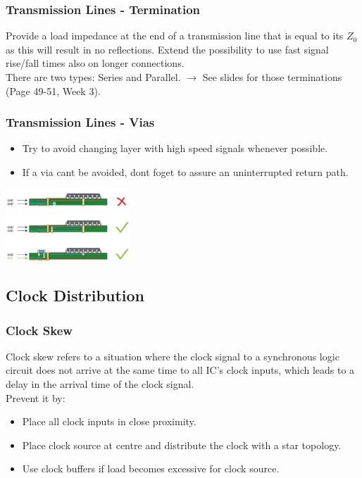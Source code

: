		\subsubsection{Transmission Lines - Termination}
			Provide a load impedance at the end of a transmission line that is equal to its $Z_0$ as this will result in no reflections. Extend the possibility to use fast signal rise/fall times also on longer connections.\\
			There are two types: Series and Parallel. $\rightarrow$ See slides for those terminations (Page 49-51, Week 3).
			
		\subsubsection{Transmission Lines - Vias}
			\begin{itemize}
				\setlength{\itemsep}{-4pt}
				\item Try to avoid changing layer with high speed signals whenever possible.
				\item If a via cant be avoided, dont foget to assure an uninterrupted return path. 
			\end{itemize}
			\begin{center}\includegraphics[width=0.35\textwidth]{images/TransmissionLineVias.png}\end{center} 
			
	\subsection{Clock Distribution}
		\subsubsection{Clock Skew}
		Clock skew refers to a situation where the clock signal to a synchronous logic circuit does not arrive at the same time to all IC's clock inputs, which leads to a delay in the arrival time of the clock signal. \\
		Prevent it by: 
		\begin{itemize}
				\setlength{\itemsep}{-4pt}
				\item Place all clock inputs in close proximity. 
				\item Place clock source at centre and distribute the clock with a star topology. 
				\item Use clock buffers if load becomes excessive for clock source.  
		\end{itemize}

